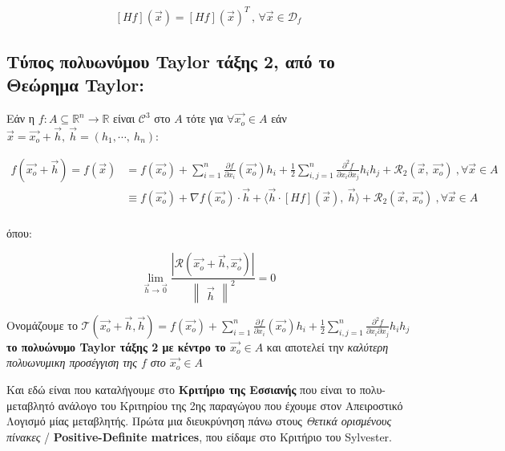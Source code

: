 \documentclass[12pt]{article}
\begin{document}
\[
[Hf](\vec{x}) = [Hf](\vec{x})^T \, , \, \forall \vec{x}\in\mathcal{D}_f \tag{0.2.1} \label{eq:6}
\]

    
\subsection{\texorpdfstring{{Τύπος πολυωνύμου Taylor τάξης 2, από το Θεώρημα Taylor:
}}{Τύπος πολυωνύμου Taylor τάξης 2, από το Θεώρημα Taylor}}

Εάν η \(f: A\subseteq\mathbb{R}^n \longrightarrow \mathbb{R}\) είναι $\mathcal{C}^3$ στο $Α$ τότε για $\forall \vec{x_o} \in A$ εάν $\vec{x} = \vec{x_o} + \vec{h}, \ \vec{h} = (h_1, \cdots , \ h_n)$:

\begin{tcolorbox}
\begin{align*} 
f(\vec{x_o}+\vec{h})=f(\vec{x}) &= f(\vec{x_o}) + \sum_{i=1}^n \frac{\partial f}{\partial x_i}(\vec{x_o})h_i + \frac{1}{2} \sum_{i, j=1}^n \frac{\partial^2f}{\partial x_i \partial x_j}h_ih_j+\mathcal{R}_2(\vec{x}, \ \vec{x_o}) \ , \forall \vec{x}\in A \\
                                &\equiv f(\vec{x_o}) + \nabla f(\vec{x_o}) \cdot \vec{h} + \langle \vec{h} \cdot [Hf](\vec{x}), \ \vec{h} \rangle +\mathcal{R}_2(\vec{x}, \ \vec{x_o}) \ , \forall \vec{x}\in A \tag{0.3.1} \label{eq:7} \\
\end{align*} 
\end{tcolorbox}

όπου:

\[
\lim_{\vec{h}\to\vec{0}}\dfrac{|\mathcal{R}(\vec{x_o}+\vec{h},\vec{x_o})|}{\begin{Vmatrix} \vec{h} \end{Vmatrix}^2}=0 \nonumber
\]

Ονομάζουμε το
\(\mathcal{T}(\vec{x_o}+\vec{h},\vec{h}) = f(\vec{x_o}) + \sum_{i=1}^n \frac{\partial f}{\partial x_i}(\vec{x_o})h_i + \frac{1}{2} \sum_{i, j=1}^n \frac{\partial^2f}{\partial x_i \partial x_j}h_ih_j\)
\textbf{το πολυώνυμο Taylor τάξης 2 με κέντρο το \(\vec{x_o} \in A\)}
και αποτελεί την \emph{καλύτερη πολυωνυμικη προσέγγιση της \(f\) στο
\(\vec{x_o} \in A\)}

Και εδώ είναι που καταλήγουμε στο \textbf{Κριτήριο της Εσσιανής} που
είναι το πολυ-μεταβλητό ανάλογο του Κριτηρίου της 2ης παραγώγου που
έχουμε στον Απειροστικό Λογισμό μίας μεταβλητής. Πρώτα μια διευκρύνηση
πάνω στους \emph{Θετικά ορισμένους πίνακες} / \textbf{Positive-Definite
matrices}, που είδαμε στο Κριτήριο του Sylvester.
\end{document}
